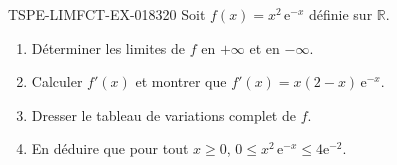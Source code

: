 \begin{exercice}{TSPE-LIMFCT-EX-018}{3}{20}
Soit $f(x) = x^2\,\mathrm{e}^{-x}$ définie sur $\mathbb{R}$.
\begin{enumerate}
  \item Déterminer les limites de $f$ en $+\infty$ et en $-\infty$.
  \item Calculer $f'(x)$ et montrer que $f'(x) = x(2-x)\,\mathrm{e}^{-x}$.
  \item Dresser le tableau de variations complet de $f$.
  \item En déduire que pour tout $x \geq 0$, $0 \leq x^2\,\mathrm{e}^{-x} \leq 4\mathrm{e}^{-2}$.
\end{enumerate}
\end{exercice}
